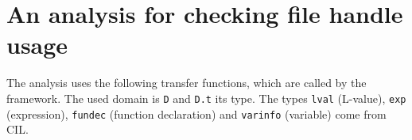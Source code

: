 \section{An analysis for checking file handle usage}
The analysis uses the following transfer functions, which are called by the framework. The used domain is \verb|D| and \verb|D.t| its type. The types \verb|lval| (L-value), \verb|exp| (expression), \verb|fundec| (function declaration) and \verb|varinfo| (variable) come from CIL.
